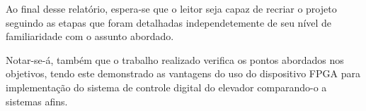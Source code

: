 \par Ao final desse relatório, espera-se que o leitor seja capaz de recriar o projeto
seguindo as etapas que foram detalhadas independetemente de seu nível de familiaridade
com o assunto abordado. 
\par Notar-se-á, também que o trabalho realizado verifica os pontos abordados nos
objetivos, tendo este demonstrado as vantagens do uso do dispositivo FPGA para
implementação do sistema de controle digital do elevador comparando-o a sistemas afins.
\par 

